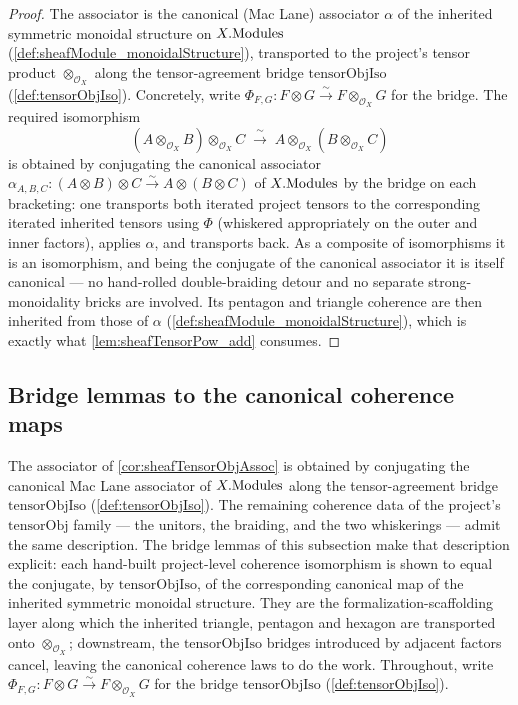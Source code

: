 \begin{proof}
  \leanok
  The associator is the canonical (Mac Lane) associator \(\alpha\) of the inherited
  symmetric monoidal structure on \(X.\mathrm{Modules}\)
  (\cref{def:sheafModule_monoidalStructure}), transported to the project's tensor
  product \(\otimes_{\mathcal{O}_X}\) along the tensor-agreement bridge
  \(\mathrm{tensorObjIso}\) (\cref{def:tensorObjIso}). Concretely, write
  \(\Phi_{F,G} : F \otimes G \xrightarrow{\sim} F \otimes_{\mathcal{O}_X} G\) for
  the bridge. The required isomorphism
  \[
    (A \otimes_{\mathcal{O}_X} B) \otimes_{\mathcal{O}_X} C
      \;\xrightarrow{\ \sim\ }\;
      A \otimes_{\mathcal{O}_X} (B \otimes_{\mathcal{O}_X} C)
  \]
  is obtained by conjugating the canonical associator
  \(\alpha_{A,B,C} : (A \otimes B) \otimes C \xrightarrow{\sim}
  A \otimes (B \otimes C)\) of \(X.\mathrm{Modules}\) by the bridge on each bracketing:
  one transports both iterated project tensors to the corresponding iterated
  inherited tensors using \(\Phi\) (whiskered appropriately on the outer and inner
  factors), applies \(\alpha\), and transports back. As a composite of
  isomorphisms it is an isomorphism, and being the conjugate of the canonical
  associator it is itself canonical --- no hand-rolled double-braiding detour and
  no separate strong-monoidality bricks are involved. Its pentagon and triangle
  coherence are then inherited from those of \(\alpha\)
  (\cref{def:sheafModule_monoidalStructure}), which is exactly what
  \cref{lem:sheafTensorPow_add} consumes.
\end{proof}


\subsection{Bridge lemmas to the canonical coherence maps}

The associator of \cref{cor:sheafTensorObjAssoc} is obtained by conjugating the
canonical Mac Lane associator of \(X.\mathrm{Modules}\) along the tensor-agreement bridge
\(\mathrm{tensorObjIso}\) (\cref{def:tensorObjIso}). The remaining coherence data
of the project's \(\mathrm{tensorObj}\) family --- the unitors, the braiding, and
the two whiskerings --- admit the same description. The bridge lemmas of this
subsection make that description explicit: each hand-built project-level
coherence isomorphism is shown to equal the conjugate, by
\(\mathrm{tensorObjIso}\), of the corresponding canonical map of the inherited
symmetric monoidal structure. They are the formalization-scaffolding layer along
which the inherited triangle, pentagon and hexagon are transported onto
\(\otimes_{\mathcal{O}_X}\); downstream, the \(\mathrm{tensorObjIso}\) bridges
introduced by adjacent factors cancel, leaving the canonical coherence laws to do
the work. Throughout, write \(\Phi_{F,G} : F \otimes G \xrightarrow{\sim}
F \otimes_{\mathcal{O}_X} G\) for the bridge \(\mathrm{tensorObjIso}\)
(\cref{def:tensorObjIso}).

